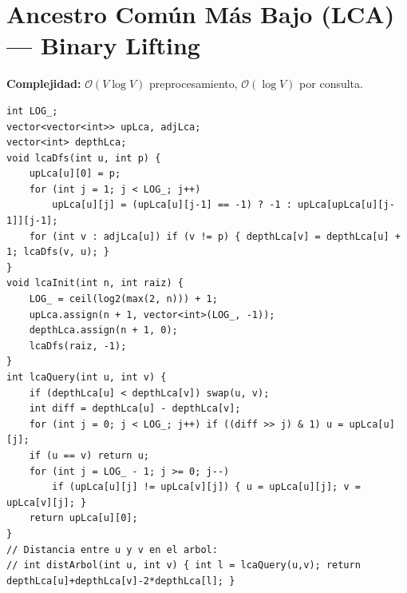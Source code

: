 \documentclass[10pt,twocolumn,letterpaper]{report}
\begin{document}
\section{Ancestro Común Más Bajo (LCA) --- Binary Lifting}
\textbf{Complejidad:} $\mathcal{O}(V \log V)$ preprocesamiento, $\mathcal{O}(\log V)$ por consulta.
\begin{lstlisting}
int LOG_;
vector<vector<int>> upLca, adjLca;
vector<int> depthLca;
void lcaDfs(int u, int p) {
    upLca[u][0] = p;
    for (int j = 1; j < LOG_; j++)
        upLca[u][j] = (upLca[u][j-1] == -1) ? -1 : upLca[upLca[u][j-1]][j-1];
    for (int v : adjLca[u]) if (v != p) { depthLca[v] = depthLca[u] + 1; lcaDfs(v, u); }
}
void lcaInit(int n, int raiz) {
    LOG_ = ceil(log2(max(2, n))) + 1;
    upLca.assign(n + 1, vector<int>(LOG_, -1));
    depthLca.assign(n + 1, 0);
    lcaDfs(raiz, -1);
}
int lcaQuery(int u, int v) {
    if (depthLca[u] < depthLca[v]) swap(u, v);
    int diff = depthLca[u] - depthLca[v];
    for (int j = 0; j < LOG_; j++) if ((diff >> j) & 1) u = upLca[u][j];
    if (u == v) return u;
    for (int j = LOG_ - 1; j >= 0; j--)
        if (upLca[u][j] != upLca[v][j]) { u = upLca[u][j]; v = upLca[v][j]; }
    return upLca[u][0];
}
// Distancia entre u y v en el arbol:
// int distArbol(int u, int v) { int l = lcaQuery(u,v); return depthLca[u]+depthLca[v]-2*depthLca[l]; }
\end{lstlisting}

\end{document}
